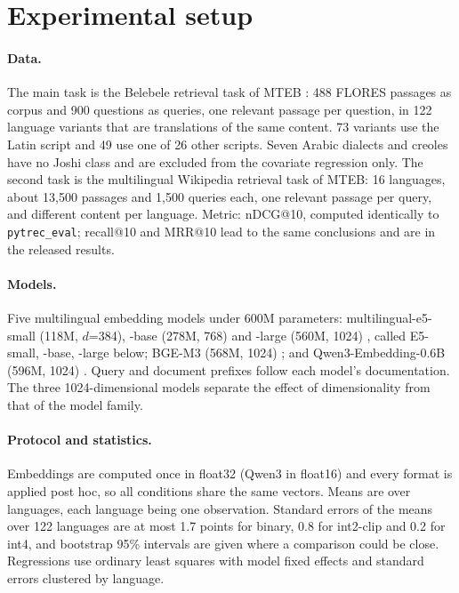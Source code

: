 \documentclass[10pt]{article}
\begin{document}
\section{Experimental setup}
\paragraph{Data.} The main task is the Belebele retrieval task of MTEB \citep{bandarkar2024belebele,enevoldsen2025mmteb}: 488 FLORES passages as corpus and 900 questions as queries, one relevant passage per question, in 122 language variants that are translations of the same content. 73 variants use the Latin script and 49 use one of 26 other scripts. Seven Arabic dialects and creoles have no Joshi class and are excluded from the covariate regression only. The second task is the multilingual Wikipedia retrieval task of MTEB: 16 languages, about 13{,}500 passages and 1{,}500 queries each, one relevant passage per query, and different content per language. Metric: nDCG@10, computed identically to \texttt{pytrec\_eval}; recall@10 and MRR@10 lead to the same conclusions and are in the released results.

\paragraph{Models.} Five multilingual embedding models under 600M parameters: multilingual-e5-small (118M, $d$=384), -base (278M, 768) and -large (560M, 1024) \citep{wang2024me5}, called E5-small, -base, -large below; BGE-M3 (568M, 1024) \citep{chen2024bgem3}; and Qwen3-Embedding-0.6B (596M, 1024) \citep{zhang2025qwen3emb}. Query and document prefixes follow each model's documentation. The three 1024-dimensional models separate the effect of dimensionality from that of the model family.

\paragraph{Protocol and statistics.} Embeddings are computed once in float32 (Qwen3 in float16) and every format is applied post hoc, so all conditions share the same vectors. Means are over languages, each language being one observation. Standard errors of the means over 122 languages are at most 1.7 points for binary, 0.8 for int2-clip and 0.2 for int4, and bootstrap 95\% intervals are given where a comparison could be close. Regressions use ordinary least squares with model fixed effects and standard errors clustered by language.
\end{document}
